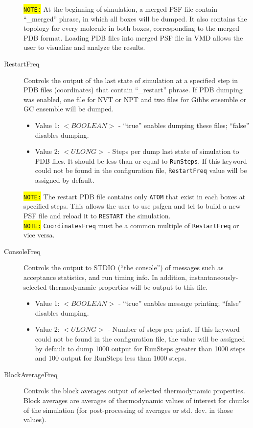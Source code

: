 \begin{description}
	\colorbox{yellow}{\texttt{NOTE:}} At the beginning of simulation, a merged PSF file contain  ``\_merged'' phrase, in which all boxes will be dumped. It also contains the topology for every molecule in both boxes, corresponding to the merged PDB format. Loading PDB files into merged PSF file in VMD allows the user to visualize and analyze the results.
\item [RestartFreq] Controls the output of the last state of simulation at a specified step in PDB files (coordinates) that contain ``\_restart'' phrase. If PDB dumping was enabled, one file for NVT or NPT and two files for Gibbs ensemble or GC ensemble will be dumped.
	\begin{itemize}
	\item Value 1: $<BOOLEAN>$ - ``true'' enables dumping these files; ``false'' disables dumping.
	\item Value 2: $<ULONG>$ - Steps per dump last state of simulation to PDB files. It should be less than or equal to \texttt{RunSteps}. If this keyword could not be found in the configuration file, \texttt{RestartFreq} value will be assigned by default.
	\end{itemize}
	\colorbox{yellow}{\texttt{NOTE:}} The restart PDB file contains only \texttt{ATOM} that exist in each boxes at specified steps. This allows the user to use psfgen and tcl to build a new PSF file and reload it to \texttt{RESTART} the simulation.\\
	\colorbox{yellow}{\texttt{NOTE:}} \texttt{CoordinatesFreq} must be a common multiple of \texttt{RestartFreq} or vice versa.
\item [ConsoleFreq] Controls the output to STDIO (``the console'') of messages such as acceptance statistics, and run timing info. In addition, instantaneously-selected thermodynamic properties will be output to this file.
	\begin{itemize}
	\item Value 1: $<BOOLEAN>$ - ``true'' enables message printing; ``false'' disables dumping.
	\item Value 2: $<ULONG>$ - Number of steps per print. If this keyword could not be found in the configuration file, the value will be assigned by default to dump 1000 output for RunSteps greater than 1000 steps and 100 output for RunSteps less than 1000 steps.
	\end{itemize}
\item [BlockAverageFreq] Controls the block averages output of selected thermodynamic properties. Block averages are averages of thermodynamic values of interest for chunks of the simulation (for post-processing of averages or std. dev. in those values).

\end{description}
